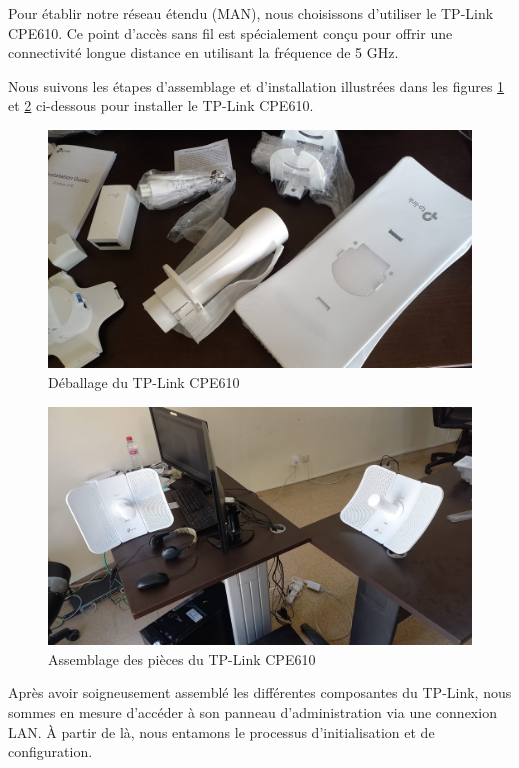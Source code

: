 Pour établir notre réseau étendu (MAN), nous choisissons  d'utiliser le TP-Link CPE610. Ce point d'accès sans fil est spécialement conçu pour offrir une connectivité longue distance en utilisant la fréquence de 5 GHz.

Nous suivons les étapes d'assemblage et d'installation illustrées dans les figures \ref{Chap2.3.2} et \ref{Chap2.3.4} ci-dessous pour installer le TP-Link CPE610.

\begin{figure}[H]
\centering
\includegraphics[width=15cm]{Images/SetupTPL4.jpg}
\caption{Déballage du TP-Link CPE610}
\label{Chap2.3.2}
\end{figure}

\begin{figure}[H]
\centering
\includegraphics[width=15cm]{Images/SetupTPL1.jpg}
\caption{Assemblage des pièces du TP-Link CPE610}
\label{Chap2.3.4}
\end{figure}


Après avoir soigneusement assemblé les différentes composantes du TP-Link, nous sommes en mesure d'accéder à son panneau d'administration via une connexion LAN. À partir de là, nous entamons le processus d'initialisation et de configuration.

